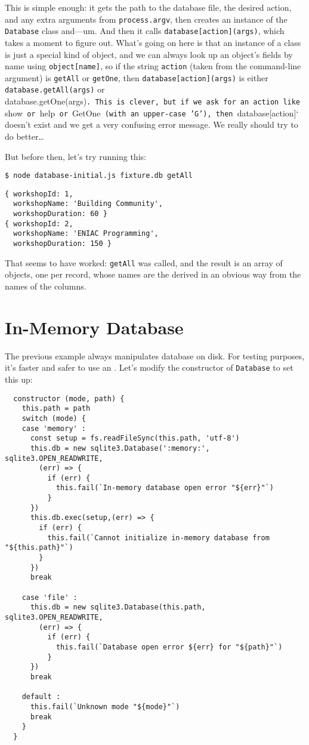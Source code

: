 This is simple enough:
it gets the path to the database file,
the desired action,
and any extra arguments from \texttt{process.argv},
then creates an instance of the \texttt{Database} class and---um.
And then it calls \texttt{database[action](args)},
which takes a moment to figure out.
What's going on here is that an instance of a class is just a special kind of object,
and we can always look up an object's fields by name using \texttt{object[name]},
so if the string \texttt{action} (taken from the command-line argument) is \texttt{getAll} or \texttt{getOne},
then \texttt{database[action](args)} is either \texttt{database.getAll(args)} or database.getOne(args)\texttt{.\ This\ is\ clever,\ but\ if\ we\ ask\ for\ an\ action\ like\ }show\texttt{\ or\ }help\texttt{\ or\ }GetOne\texttt{\ (with\ an\ upper-case\ 'G'),\ then\ }database[action]` doesn't exist and we get a very confusing error message.
We really should try to do better{\ldots}

But before then,
let's try running this:

\begin{verbatim}
$ node database-initial.js fixture.db getAll
\end{verbatim}

\begin{verbatim}
{ workshopId: 1,
  workshopName: 'Building Community',
  workshopDuration: 60 }
{ workshopId: 2,
  workshopName: 'ENIAC Programming',
  workshopDuration: 150 }
\end{verbatim}

That seems to have worked:
\texttt{getAll} was called,
and the result is an array of objects,
one per record,
whose names are the derived in an obvious way from the names of the columns.

\section{In-Memory Database}\label{s:db-in-memory}

The previous example always manipulates database on disk.
For testing purposes,
it's faster and safer to use an .
Let's modify the constructor of \texttt{Database} to set this up:

\begin{verbatim}
  constructor (mode, path) {
    this.path = path
    switch (mode) {
    case 'memory' :
      const setup = fs.readFileSync(this.path, 'utf-8')
      this.db = new sqlite3.Database(':memory:', sqlite3.OPEN_READWRITE,
        (err) => {
          if (err) {
            this.fail(`In-memory database open error "${err}"`)
          }
      })
      this.db.exec(setup,(err) => {
        if (err) {
          this.fail(`Cannot initialize in-memory database from "${this.path}"`)
        }
      })
      break

    case 'file' :
      this.db = new sqlite3.Database(this.path, sqlite3.OPEN_READWRITE,
        (err) => {
          if (err) {
            this.fail(`Database open error ${err} for "${path}"`)
          }
      })
      break

    default :
      this.fail(`Unknown mode "${mode}"`)
      break
    }
  }
\end{verbatim}

